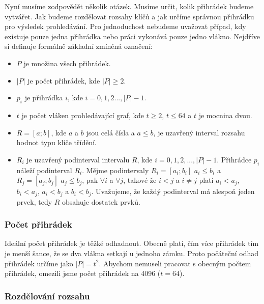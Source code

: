Nyní musíme zodpovědět několik otázek.
Musíme určit, kolik přihrádek budeme vytvářet.
Jak budeme rozdělovat rozsahy klíčů a jak určíme správnou přihrádku pro výsledek prohledávání.
Pro jednoduchost nebudeme uvažovat případ, kdy existuje pouze jedna přihrádka nebo práci vykonává pouze jedno vlákno.
Nejdříve si definuje formálně základní zmíněná označení:

\begin{itemize}

\item $P$ je množina všech přihrádek.

\item $|P|$ je počet přihrádek, kde $|P|\geq2$.

\item $p_i$ je přihrádka $i$, kde $i=0, 1, 2 ..., |P|-1$.

\item $t$ je počet vláken prohledávající graf, kde $t\geq2$, $t\leq64$ a $t$ je mocnina dvou.

\item $R=[a; b]$, kde $a$ a $b$ jsou celá čísla a $a\leq b$, je uzavřený interval rozsahu hodnot typu klíče třídění.

\item $R_i$ je uzavřený podinterval intervalu $R$, kde $i=0, 1, 2, ..., |P|-1$.
Přihrádce $p_i$ náleží podinterval $R_i$.
Mějme podintervaly $R_i=[a_i; b_i]$ $a_i\leq b_i$ a $R_j=[a_j; b_j]$ $a_j\leq b_j$, pak $\forall i$ a $\forall j$, takové že $i<j$ a $i\neq j$ platí $a_i<a_j$, $b_i<a_j$, $a_i<b_j$ a $b_i<b_j$.
Uvažujeme, že každý podinterval má alespoň jeden prvek, tedy $R$ obsahuje dostatek prvků.

\end{itemize}

\subsubsection{Počet přihrádek}

Ideální počet přihrádek je těžké odhadnout.
Obecně platí, čím více přihrádek tím je menší šance, že se dva vlákna setkají u jednoho zámku.
Proto počáteční odhad přihrádek určíme jako $|P|=t^2$.
Abychom nemuseli pracovat s obecným počtem přihrádek, omezili jsme počet přihrádek na 4096 ($t=64$).

\subsubsection{Rozdělování rozsahu}

